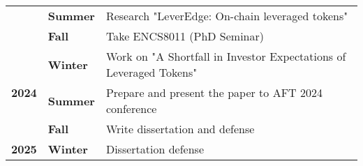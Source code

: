 \begin{table}[h]
{\begin{tabular}{|c|l|l|}
			& \textbf{Summer} & Research "LeverEdge: On-chain leveraged tokens" \\ \cline{2-3} 
			& \textbf{Fall} & Take ENCS8011 (PhD Seminar) \\ \hline
			\multirow{3}{*}{\textbf{2024}} & \textbf{Winter} & Work on "A Shortfall in Investor Expectations of Leveraged Tokens" \\ \cline{2-3} 
			& \textbf{Summer} & Prepare and present the paper to AFT 2024 conference \\ \cline{2-3} 
			& \textbf{Fall} & Write dissertation and defense \\ \hline
			\textbf{2025} & \textbf{Winter} & Dissertation defense \\ \hline
		\end{tabular}%
	}
\end{table}